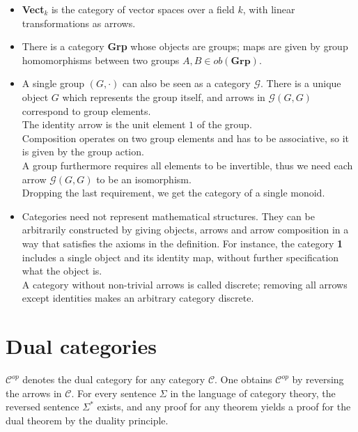 \begin {itemize}
  \item \textbf{Vect$_k$} is the category of vector spaces over a field $k$, with linear transformations as arrows.
  
  \item There is a category \textbf{Grp} whose objects are groups; maps are given by group homomorphisms between two groups $A,B \in ob(\textbf{Grp}).$ 
  
  \item A single group $(G, \cdot)$ can also be seen as a category $\mathcal{G}$. There is a unique object $G$ which represents the group itself, and arrows in $\mathcal{G}(G, G)$  correspond to group elements. \\
    The identity arrow is the unit element $1$ of the group.\\
    Composition operates on two group elements and has to be associative, so it is given by the group action.\\
    A group furthermore requires all elements to be invertible, thus we need each arrow $\mathcal{G}(G, G)$ to be an isomorphism.\\
    Dropping the last requirement, we get the category of a single monoid.

  
  \item Categories need not represent mathematical structures. They can be arbitrarily constructed by giving objects, arrows and arrow composition in a way that satisfies the axioms in the definition. For instance, the category \textbf{1} includes a single object and its identity map, without further specification what the object is. \\
    A category without non-trivial arrows is called discrete; removing all arrows except identities makes an arbitrary category discrete.
 \end {itemize}

 \section {Dual categories}

 $\mathscr{C}^{op}$ denotes the dual category for any category $\mathscr{C}$. One obtains $\mathscr{C}^{op}$ by reversing the arrows in $\mathscr{C}$. For every sentence $\Sigma$ in the language of category theory, the reversed sentence $\Sigma^*$ exists, and any proof for any theorem yields a proof for the dual theorem by the duality principle.

